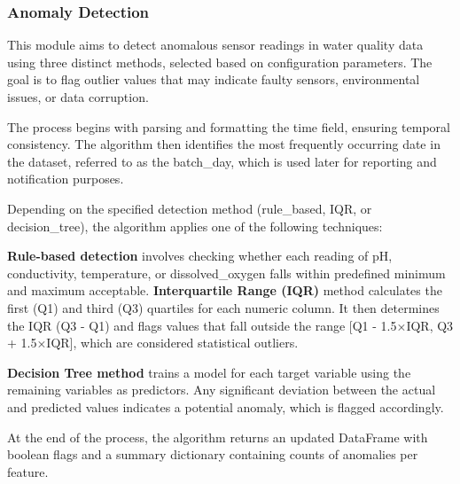 \subsubsection{Anomaly Detection}
This module aims to detect anomalous sensor readings in water quality data using three distinct methods, selected based on configuration parameters. The goal is to flag outlier values that may indicate faulty sensors, environmental issues, or data corruption.

The process begins with parsing and formatting the time field, ensuring temporal consistency. The algorithm then identifies the most frequently occurring date in the dataset, referred to as the batch\_day, which is used later for reporting and notification purposes.

Depending on the specified detection method (rule\_based, IQR, or decision\_tree), the algorithm applies one of the following techniques:

\textbf{Rule-based detection }involves checking whether each reading of pH, conductivity, temperature, or dissolved\_oxygen falls within predefined minimum and maximum acceptable.
\newline
\textbf{Interquartile Range (IQR)} method calculates the first (Q1) and third (Q3) quartiles for each numeric column. It then determines the IQR (Q3 - Q1) and flags values that fall outside the range [Q1 - 1.5×IQR, Q3 + 1.5×IQR], which are considered statistical outliers.

\textbf{Decision Tree method} trains a model for each target variable using the remaining variables as predictors. Any significant deviation between the actual and predicted values indicates a potential anomaly, which is flagged accordingly.

At the end of the process, the algorithm returns an updated DataFrame with boolean flags and a summary dictionary containing counts of anomalies per feature.

